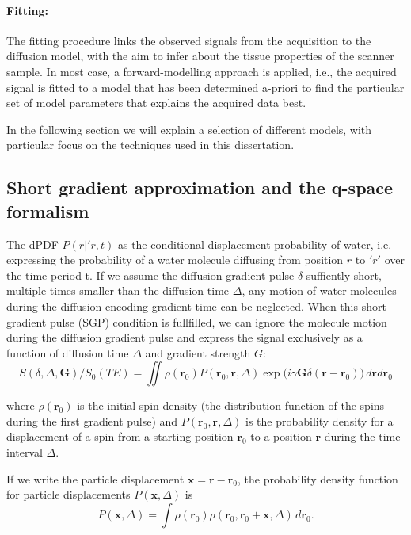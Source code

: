\paragraph{Fitting:} The fitting procedure links the observed signals from the acquisition to the diffusion model, with the aim to infer about the tissue properties of the scanner sample. In most case, a forward-modelling approach is applied, i.e., the acquired signal is fitted to a model that has been determined a-priori to find the particular set of model parameters that explains the acquired data best.  


In the following section we will explain a selection of different models, with particular focus on the techniques used in this dissertation. 
\subsection{Short gradient approximation and the q-space formalism}
The \gls{dPDF} $P(r|\prime{r},t)$ as the conditional displacement probability of water, i.e. expressing the probability of a water molecule diffusing from position $r$ to $\prime{r}'$ over the time period t. If we assume the diffusion gradient pulse $\delta$ suffiently short, multiple times smaller than the diffusion time $\Delta$, any motion of water molecules during the diffusion encoding gradient time can be neglected. When this short gradient pulse (SGP) condition is fullfilled, we can ignore the molecule motion during the diffusion gradient pulse and express the signal exclusively as a function of diffusion time $\Delta$ and gradient strength $G$\citep{Callaghan:1991}:
\begin{equation}
S(\delta,\Delta,\textbf{G})/S_{0}(TE) = \iint \rho(\textbf{r}_{0})P(\textbf{r}_{0},\textbf{r},\Delta)\exp\Big(i \gamma \textbf{G} \delta (\textbf{r}-\textbf{r}_{0}) \Big)\,d\textbf{r} d\textbf{r}_{0}
\label{eq:chapter2 signal in sgp}
\end{equation}

where $\rho(\textbf{r}_{0})$ is the initial spin density (the distribution function of the spins during the first gradient pulse)
and $P(\textbf{r}_{0},\textbf{r},\Delta)$ is the probability density for a displacement of a spin from a starting position $\textbf{r}_{0}$ to a position $\textbf{r}$ during the time interval $\Delta$. 

If we write the particle displacement $\textbf{x} = \textbf{r}-\textbf{r}_{0}$, the probability density function for particle  displacements  $P(\textbf{x},\Delta)$ is
\begin{equation}
P(\textbf{x},\Delta) = \int\rho(\textbf{r}_{0})\rho(\textbf{r}_{0},\textbf{r}_{0} + \textbf{x}, \Delta)\,d\textbf{r}_{0}.      %
\end{equation}

